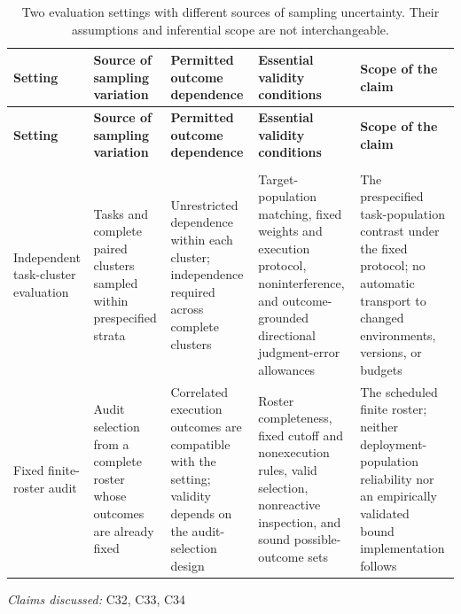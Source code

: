 \documentclass[11pt]{article}
\begin{document}
\begin{landscape}
\small
\begin{longtable}{@{}>{\raggedright\arraybackslash}p{}>{\raggedright\arraybackslash}p{}>{\raggedright\arraybackslash}p{}>{\raggedright\arraybackslash}p{}>{\raggedright\arraybackslash}p{}@{}}
\caption{Two evaluation settings with different sources of sampling uncertainty. Their assumptions and inferential scope are not interchangeable.}\\
\toprule
\textbf{Setting} & \textbf{Source of sampling variation} & \textbf{Permitted outcome dependence} & \textbf{Essential validity conditions} & \textbf{Scope of the claim}\\
\midrule
\endfirsthead
\toprule
\textbf{Setting} & \textbf{Source of sampling variation} & \textbf{Permitted outcome dependence} & \textbf{Essential validity conditions} & \textbf{Scope of the claim}\\
\midrule
\endhead
\midrule
\multicolumn{5}{r}{\footnotesize Continued on next page}\\
\endfoot
\bottomrule
\endlastfoot
Independent task-cluster evaluation & Tasks and complete paired clusters sampled within prespecified strata & Unrestricted dependence within each cluster; independence required across complete clusters & Target-population matching, fixed weights and execution protocol, noninterference, and outcome-grounded directional judgment-error allowances & The prespecified task-population contrast under the fixed protocol; no automatic transport to changed environments, versions, or budgets\\
Fixed finite-roster audit & Audit selection from a complete roster whose outcomes are already fixed & Correlated execution outcomes are compatible with the setting; validity depends on the audit-selection design & Roster completeness, fixed cutoff and nonexecution rules, valid selection, nonreactive inspection, and sound possible-outcome sets & The scheduled finite roster; neither deployment-population reliability nor an empirically validated bound implementation follows\\
\end{longtable}
\par{}
\end{landscape}
\textit{Claims discussed: }C32, C33, C34
\end{document}
